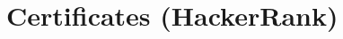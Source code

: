 \documentclass[A4paper, 11pt]{article}
\begin{document}


        




\section{Certificates (HackerRank)}

\end{document}

